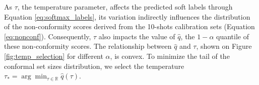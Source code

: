 As $\tau$, the temperature parameter, affects the predicted soft labels through Equation \ref{eq:softmax_labels}, its variation indirectly influences the distribution of the non-conformity scores derived from the 10-shots calibration sets (Equation \ref{eq:nonconf}). Consequently, $\tau$ also impacts the value of $\hat{q}$, the $1-\alpha$ quantile of these non-conformity scores. The relationship between $\hat{q}$ and $\tau$, shown on Figure \ref{fig:temp_selection} for different $\alpha$, is convex. To minimize the tail of the conformal set sizes distribution, we select the temperature $\tau_* = \arg \min_{\tau \in\mathbb{R}} \hat{q}(\tau)$.

